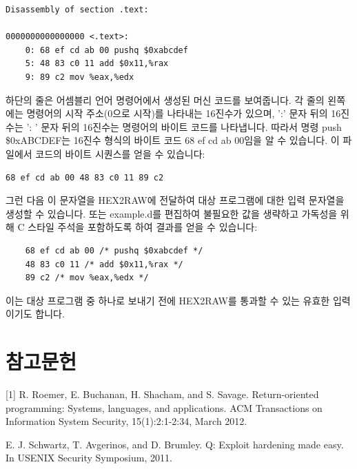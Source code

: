 \documentclass[10pt]{article}
\begin{document}
\begin{verbatim}
Disassembly of section .text:

0000000000000000 <.text>:
    0: 68 ef cd ab 00 pushq $0xabcdef
    5: 48 83 c0 11 add $0x11,%rax
    9: 89 c2 mov %eax,%edx
\end{verbatim}
\noindent
하단의 줄은 어셈블리 언어 명령어에서 생성된 머신 코드를 보여줍니다. 각 줄의 왼쪽에는 명령어의 시작 주소(0으로 시작)를 나타내는 16진수가 있으며, ':' 문자 뒤의 16진수는
': ' 문자 뒤의 16진수는 명령어의 바이트 코드를 나타냅니다. 따라서 명령 push \$0xABCDEF는 16진수 형식의 바이트 코드 68 ef cd ab 00임을 알 수 있습니다.
\noindent
이 파일에서 코드의 바이트 시퀀스를 얻을 수 있습니다:

\begin{verbatim}
68 ef cd ab 00 48 83 c0 11 89 c2
\end{verbatim}
\noindent
그런 다음 이 문자열을 HEX2RAW에 전달하여 대상 프로그램에 대한 입력 문자열을 생성할 수 있습니다. 또는 example.d를 편집하여 불필요한 값을 생략하고 가독성을 위해 C 스타일 주석을 포함하도록 하여 결과를 얻을 수 있습니다:

\begin{verbatim}
    68 ef cd ab 00 /* pushq $0xabcdef */
    48 83 c0 11 /* add $0x11,%rax */
    89 c2 /* mov %eax,%edx */
\end{verbatim}
\noindent
이는 대상 프로그램 중 하나로 보내기 전에 HEX2RAW를 통과할 수 있는 유효한 입력이기도 합니다.

\section*{참고문헌}
[1] R. Roemer, E. Buchanan, H. Shacham, and S. Savage. Return-oriented programming: Systems, languages, and applications. ACM Transactions on Information System Security, 15(1):2:1-2:34, March 2012.

\noindent
[2] E. J. Schwartz, T. Avgerinos, and D. Brumley. Q: Exploit hardening made easy. In USENIX Security Symposium, 2011.
\end{document}
